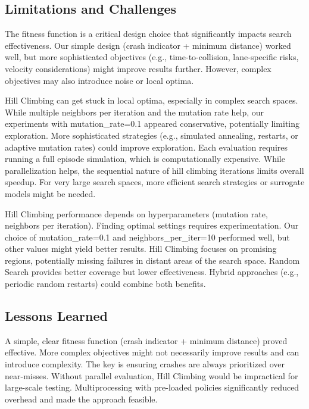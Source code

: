 \documentclass[11pt,a4paper]{article}
\begin{document}
\subsection{Limitations and Challenges}

The fitness function is a critical design choice that significantly impacts search effectiveness. Our simple design (crash indicator + minimum distance) worked well, but more sophisticated objectives (e.g., time-to-collision, lane-specific risks, velocity considerations) might improve results further. However, complex objectives may also introduce noise or local optima.

Hill Climbing can get stuck in local optima, especially in complex search spaces. While multiple neighbors per iteration and the mutation rate help, our experiments with mutation\_rate=0.1 appeared conservative, potentially limiting exploration. More sophisticated strategies (e.g., simulated annealing, restarts, or adaptive mutation rates) could improve exploration. Each evaluation requires running a full episode simulation, which is computationally expensive. While parallelization helps, the sequential nature of hill climbing iterations limits overall speedup. For very large search spaces, more efficient search strategies or surrogate models might be needed.

Hill Climbing performance depends on hyperparameters (mutation rate, neighbors per iteration). Finding optimal settings requires experimentation. Our choice of mutation\_rate=0.1 and neighbors\_per\_iter=10 performed well, but other values might yield better results. Hill Climbing focuses on promising regions, potentially missing failures in distant areas of the search space. Random Search provides better coverage but lower effectiveness. Hybrid approaches (e.g., periodic random restarts) could combine both benefits.

\subsection{Lessons Learned}

A simple, clear fitness function (crash indicator + minimum distance) proved effective. More complex objectives might not necessarily improve results and can introduce complexity. The key is ensuring crashes are always prioritized over near-misses. Without parallel evaluation, Hill Climbing would be impractical for large-scale testing. Multiprocessing with pre-loaded policies significantly reduced overhead and made the approach feasible.
\end{document}
